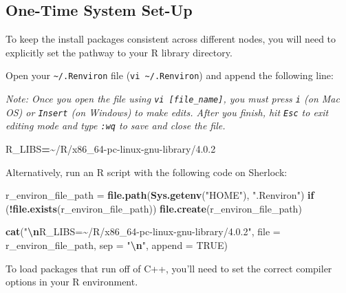 \documentclass[
]{book}
\newenvironment{Shaded}{\begin{snugshade}}{\end{snugshade}}
\newcommand{\AttributeTok}[1]{\textcolor[rgb]{0.13,0.29,0.53}{#1}}
\newcommand{\ConstantTok}[1]{\textcolor[rgb]{0.56,0.35,0.01}{#1}}
\newcommand{\ControlFlowTok}[1]{\textcolor[rgb]{0.13,0.29,0.53}{\textbf{#1}}}
\newcommand{\FunctionTok}[1]{\textcolor[rgb]{0.13,0.29,0.53}{\textbf{#1}}}
\newcommand{\NormalTok}[1]{#1}
\newcommand{\OperatorTok}[1]{\textcolor[rgb]{0.81,0.36,0.00}{\textbf{#1}}}
\newcommand{\OtherTok}[1]{\textcolor[rgb]{0.56,0.35,0.01}{#1}}
\newcommand{\SpecialCharTok}[1]{\textcolor[rgb]{0.81,0.36,0.00}{\textbf{#1}}}
\newcommand{\StringTok}[1]{\textcolor[rgb]{0.31,0.60,0.02}{#1}}
\newcommand{\VariableTok}[1]{\textcolor[rgb]{0.00,0.00,0.00}{#1}}
\begin{document}
\subsection{One-Time System Set-Up}\label{one-time-system-set-up}

To keep the install packages consistent across different nodes, you will need to explicitly set the pathway to your R library directory.

Open your \texttt{\textasciitilde{}/.Renviron} file (\texttt{vi\ \textasciitilde{}/.Renviron}) and append the following line:

\emph{Note: Once you open the file using \texttt{vi\ {[}file\_name{]}}, you must press \texttt{i} (on Mac OS) or \texttt{Insert} (on Windows) to make edits. After you finish, hit \texttt{Esc} to exit editing mode and type \texttt{:wq} to save and close the file.}

\begin{Shaded}
\begin{Highlighting}[]
\VariableTok{R\_LIBS}\OperatorTok{=}\NormalTok{\textasciitilde{}/R/x86\_64{-}pc{-}linux{-}gnu{-}library/4.0.2}
\end{Highlighting}
\end{Shaded}

Alternatively, run an R script with the following code on Sherlock:

\begin{Shaded}
\begin{Highlighting}[]
\NormalTok{r\_environ\_file\_path }\OtherTok{=} \FunctionTok{file.path}\NormalTok{(}\FunctionTok{Sys.getenv}\NormalTok{(}\StringTok{"HOME"}\NormalTok{), }\StringTok{".Renviron"}\NormalTok{)}
\ControlFlowTok{if}\NormalTok{ (}\SpecialCharTok{!}\FunctionTok{file.exists}\NormalTok{(r\_environ\_file\_path)) }\FunctionTok{file.create}\NormalTok{(r\_environ\_file\_path)}

\FunctionTok{cat}\NormalTok{(}\StringTok{"}\SpecialCharTok{\textbackslash{}n}\StringTok{R\_LIBS=\textasciitilde{}/R/x86\_64{-}pc{-}linux{-}gnu{-}library/4.0.2"}\NormalTok{,}
    \AttributeTok{file =}\NormalTok{ r\_environ\_file\_path, }\AttributeTok{sep =} \StringTok{"}\SpecialCharTok{\textbackslash{}n}\StringTok{"}\NormalTok{, }\AttributeTok{append =} \ConstantTok{TRUE}\NormalTok{)}
\end{Highlighting}
\end{Shaded}

To load packages that run off of C++, you'll need to set the correct compiler options in your R environment.
\end{document}

